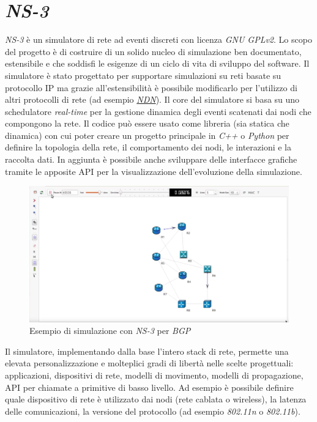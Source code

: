 \section{\textit{NS-3}}
\textit{NS-3} è un simulatore di rete ad eventi discreti con licenza \textit{GNU GPLv2}. Lo scopo del progetto è di costruire di un solido nucleo di simulazione ben documentato, estensibile e che soddisfi le esigenze di un ciclo di vita di sviluppo del software.\newline
Il simulatore è stato progettato per supportare simulazioni su reti basate su protocollo IP ma grazie all'estensibilità è possibile modificarlo per l'utilizzo di altri protocolli di rete (ad esempio \href{https://named-data.net/}{\textit{NDN}}). Il core del simulatore si basa su uno schedulatore \textit{real-time} per la gestione dinamica degli eventi scatenati dai nodi che compongono la rete.\newline
Il codice può essere usato come libreria (sia statica che dinamica) con cui poter creare un progetto principale in \textit{C++} o \textit{Python} per definire la topologia della rete, il comportamento dei nodi, le interazioni e la raccolta dati. In aggiunta è possibile anche sviluppare delle interfacce grafiche tramite le apposite API per la visualizzazione dell'evoluzione della simulazione.
\begin{figure}[H]
    \includegraphics[width=\textwidth]{images/ns3.png}
    \caption{Esempio di simulazione con \textit{NS-3} per \textit{BGP}}
\end{figure}
Il simulatore, implementando dalla base l'intero stack di rete, permette una elevata personalizzazione e molteplici gradi di libertà nelle scelte progettuali: applicazioni, dispositivi di rete, modelli di movimento, modelli di propagazione, API per chiamate a primitive di basso livello. Ad esempio è possibile definire quale dispositivo di rete è utilizzato dai nodi (rete cablata o wireless), la latenza delle comunicazioni, la versione del protocollo (ad esempio \textit{802.11n} o \textit{802.11b}).\newline
